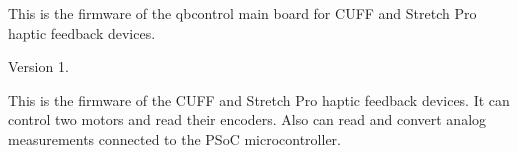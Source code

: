 This is the firmware of the qbcontrol main board for C\+U\+FF and Stretch Pro haptic feedback devices. \begin{DoxyVersion}{Version}
1.
\end{DoxyVersion}
This is the firmware of the C\+U\+FF and Stretch Pro haptic feedback devices. It can control two motors and read their encoders. Also can read and convert analog measurements connected to the P\+SoC microcontroller. 